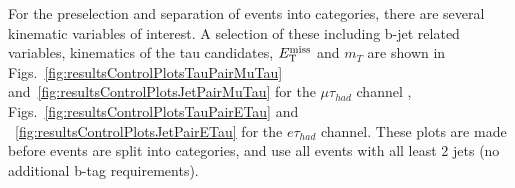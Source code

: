For the preselection and separation of events into categories, there are several
kinematic variables of interest. A selection of these including b-jet related
variables, kinematics of the tau candidates, $E_{\mathrm{T}}^{\text{miss}}$ and $m_{T}$ are shown in
Figs.~\ref{fig:resultsControlPlotsTauPairMuTau}
and~\ref{fig:resultsControlPlotsJetPairMuTau} for the $\mu\tau_{had}$ channel
, Figs.~\ref{fig:resultsControlPlotsTauPairETau} and
~\ref{fig:resultsControlPlotsJetPairETau} for the $e\tau_{had}$ channel.
These plots are made before events are split into categories, and use all events
with all least 2 jets (no additional b-tag requirements).


\begin{figure}
\begin{center}



\end{center}
\end{figure}
